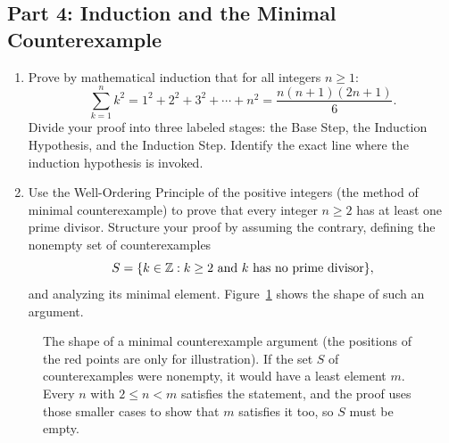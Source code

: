 \subsection{Part 4: Induction and the Minimal Counterexample}

\begin{enumerate}[resume]
  \item Prove by mathematical induction that for all integers $n \ge 1$:
  \[
  \sum_{k=1}^n k^2 = 1^2 + 2^2 + 3^2 + \cdots + n^2 = \frac{n(n+1)(2n+1)}{6}.
  \]
  Divide your proof into three labeled stages: the Base Step, the Induction Hypothesis, and the Induction Step. Identify the exact line where the induction hypothesis is invoked.
  \item Use the Well-Ordering Principle of the positive integers (the method of minimal counterexample) to prove that every integer $n \ge 2$ has at least one prime divisor.
  Structure your proof by assuming the contrary, defining the nonempty set of counterexamples
  \[
  S = \{k \in \mathbb{Z} : k \ge 2 \text{ and } k \text{ has no prime divisor}\},
  \]
  and analyzing its minimal element. Figure~\ref{exam:fig-minimal-counterexample} shows the shape of such an argument.
\end{enumerate}

\begin{figure}[htbp]
\centering
{}
\caption{The shape of a minimal counterexample argument (the positions of the red points are only for illustration). If the set $S$ of counterexamples were nonempty, it would have a least element $m$. Every $n$ with $2 \le n < m$ satisfies the statement, and the proof uses those smaller cases to show that $m$ satisfies it too, so $S$ must be empty.}\label{exam:fig-minimal-counterexample}
\end{figure}


